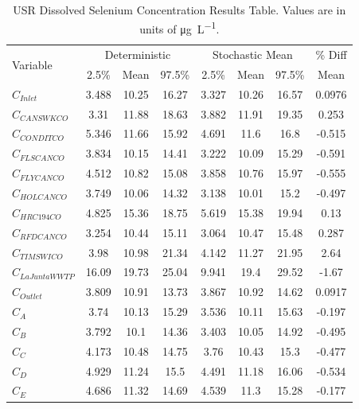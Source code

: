 \begin{linenumbers}
\begin{table}[htbp]
  \centering
  \caption[USR Dissolved Selenium Concentration Results Table]{USR Dissolved Selenium Concentration Results Table.  Values are in units of \si{\micro\gram\per\liter}.}
  \label{tab:USRConcResults}
    \begin{tabular}{l|ccc|ccc|c}
    \toprule
    \multirow{2}[0]{*}{Variable} & \multicolumn{3}{c}{Deterministic} & \multicolumn{3}{c}{Stochastic Mean} & \% Diff\\\cline{2-4} \cline{5-7}
    & 2.5\% & Mean & 97.5\% & 2.5\% & Mean & 97.5\% & Mean\\
    \midrule
    \midrule
	$C_{Inlet}$&		3.488	&10.25	&16.27	&3.327	&10.26	&16.57	&0.0976	\\
	$C_{CANSWKCO}$&		3.31	&11.88	&18.63	&3.882	&11.91	&19.35	&0.253	\\
	$C_{CONDITCO}$&		5.346	&11.66	&15.92	&4.691	&11.6	&16.8	&-0.515	\\
	$C_{FLSCANCO}$&		3.834	&10.15	&14.41	&3.222	&10.09	&15.29	&-0.591	\\
	$C_{FLYCANCO}$&		4.512	&10.82	&15.08	&3.858	&10.76	&15.97	&-0.555	\\
	$C_{HOLCANCO}$&		3.749	&10.06	&14.32	&3.138	&10.01	&15.2	&-0.497	\\
	$C_{HRC194CO}$&		4.825	&15.36	&18.75	&5.619	&15.38	&19.94	&0.13	\\
	$C_{RFDCANCO}$&		3.254	&10.44	&15.11	&3.064	&10.47	&15.48	&0.287	\\
	$C_{TIMSWICO}$&		3.98	&10.98	&21.34	&4.142	&11.27	&21.95	&2.64	\\
	$C_{La Junta WWTP}$&	16.09	&19.73	&25.04	&9.941	&19.4	&29.52	&-1.67	\\
	$C_{Outlet}$&		3.809	&10.91	&13.73	&3.867	&10.92	&14.62	&0.0917	\\
	$C_{A}$&			3.74	&10.13	&15.29	&3.536	&10.11	&15.63	&-0.197	\\
	$C_{B}$&			3.792	&10.1	&14.36	&3.403	&10.05	&14.92	&-0.495	\\
	$C_{C}$&			4.173	&10.48	&14.75	&3.76	&10.43	&15.3	&-0.477	\\
	$C_{D}$&			4.929	&11.24	&15.5	&4.491	&11.18	&16.06	&-0.534	\\
	$C_{E}$&			4.686	&11.32	&14.69	&4.539	&11.3	&15.28	&-0.177	\\
    \bottomrule
    \end{tabular}
\end{table}


\end{linenumbers}

